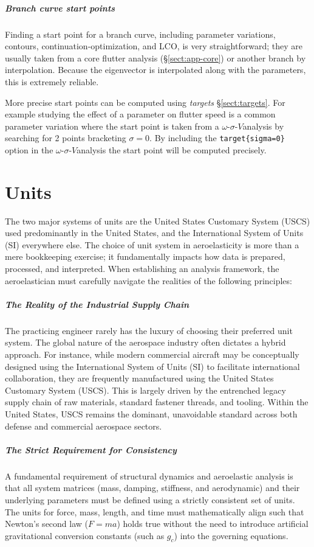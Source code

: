 \documentclass[10pt,openany,twoside]{book}
\numberwithin{equation}{section}   %
\newcommand{\Newterm}[1]{{\em #1}}
\newcommand{\Code}[1]{{\small\tt #1}}
\newcommand{\Sectref}[1]{\S\ref{#1}}
\newcommand{\OSV}{$\omega$-$\sigma$-$V$\:}               %
\begin{document}
\subparagraph{Branch curve start points}\label{sect:pv-start}
Finding a start point for a branch curve, including parameter variations,
contours, continuation-optimization, and LCO,
is very straightforward; they are usually
taken from a core flutter analysis (\Sectref{sect:app-core}) or another
branch by interpolation. Because the eigenvector is interpolated
along with the parameters, this is extremely reliable.

More precise start points can be computed using \Newterm{targets}
\Sectref{sect:targets}. For example studying the effect of a parameter
on flutter speed is a common parameter variation where the start point is
taken from a \OSV analysis by searching for 2 points bracketing $\sigma=0$.
By including the \Code{target\{sigma=0\}} option in the \OSV analysis the
start point will be computed precisely.


\section{Units}\label{sect:units}
The two major systems of units are the United States Customary System (USCS)
used predominantly in the United States,
and the International System of Units (SI) everywhere else.
The choice of unit system in aeroelasticity is more than a mere
bookkeeping exercise; it fundamentally impacts how data is prepared,
processed, and interpreted. When establishing an analysis framework,
the aeroelastician must carefully navigate the realities of the following
principles:

\subparagraph{The Reality of the Industrial Supply Chain} The practicing
engineer rarely has the luxury of choosing their preferred unit
system. The global nature of the aerospace industry often dictates a
hybrid approach. For instance, while modern commercial aircraft may be
conceptually designed using the International System of Units (SI) to
facilitate international collaboration, they are frequently manufactured
using the United States Customary System (USCS). This is largely
driven by the entrenched legacy supply chain of raw materials, standard
fastener threads, and tooling. Within the United States, USCS remains
the dominant, unavoidable standard across both defense and commercial
aerospace sectors.

\subparagraph{The Strict Requirement for Consistency}
A fundamental requirement of structural dynamics and aeroelastic
analysis is that all system matrices (mass, damping, stiffness, and
aerodynamic) and their underlying parameters must be defined using a
strictly consistent set of units. The units for force, mass, length,
and time must mathematically align such that Newton's second law ($F =
ma$) holds true without the need to introduce artificial gravitational
conversion constants (such as $g_c$) into the governing equations.
\end{document}
